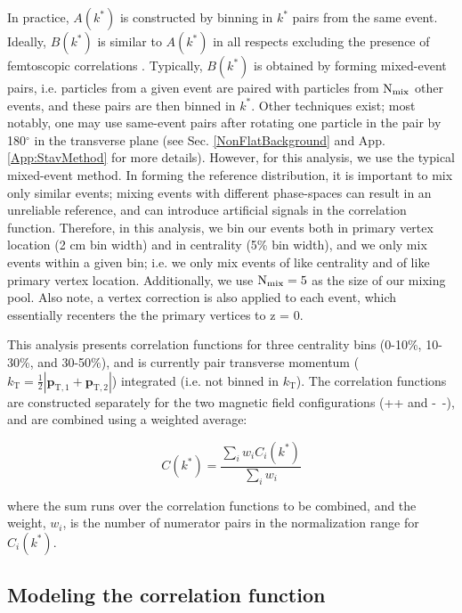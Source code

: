 \documentclass[ALICE,manyauthors]{cernphprep}
\newcommand{\kstar}{$k^{*}$\xspace}
\begin{document}
In practice, $A(k^{*})$ is constructed by binning in \kstar pairs from the same event.
Ideally, $B(k^{*})$ is similar to $A(k^{*})$ in all respects excluding the presence of femtoscopic correlations \cite{Lisa:2005dd}.
Typically, $B(k^{*})$ is obtained by forming mixed-event pairs, i.e. particles from a given event are paired with particles from $\rm N_{mix}$ other events, and these pairs are then binned in \kstar.
Other techniques exist; most notably, one may use same-event pairs after rotating one particle in the pair by 180$^\circ$ in the transverse plane (see Sec. \ref{NonFlatBackground} and App. \ref{App:StavMethod} for more details).
However, for this analysis, we use the typical mixed-event method.
In forming the reference distribution, it is important to mix only similar events; mixing events with different phase-spaces can result in an unreliable reference, and can introduce artificial signals in the correlation function.
Therefore, in this analysis, we bin our events both in primary vertex location (2 cm bin width) and in centrality (5\% bin width), and we only mix events within a given bin; i.e. we only mix events of like centrality and of like primary vertex location.
Additionally, we use $\rm N_{mix} = 5$ as the size of our mixing pool.
Also note, a vertex correction is also applied to each event, which essentially recenters the the primary vertices to z = 0.


This analysis presents correlation functions for three centrality bins (0-10\%, 10-30\%, and 30-50\%), and is currently pair transverse momentum ($k_{\mathrm{T}} = \frac{1}{2}|\mathbf{p}_{\mathrm{T,1}}+\mathbf{p}_{\mathrm{T,2}}|$) integrated (i.e. not binned in $k_{\mathrm{T}}$).  
The correlation functions are constructed separately for the two magnetic field configurations (++ and -~-), and are combined using a weighted average:

\begin{equation}
  C(k^{*}) = \frac{\sum\limits_{i}w_{i}C_{i}(k^{*})}{\sum\limits_{i}w_{i}} 
\label{eqn:CombineCfs}
\end{equation}

where the sum runs over the correlation functions to be combined, and the weight, $w_{i}$, is the number of numerator pairs in the normalization range for $C_{i}(k^{*})$.

\subsection{Modeling the correlation function}
\label{sec:ModelingCF}
\end{document}

